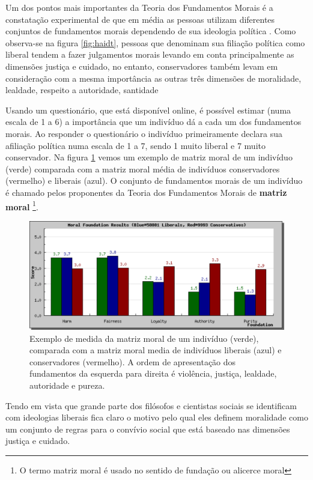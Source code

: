 Um dos pontos mais importantes da Teoria dos Fundamentos Morais é a
constatação experimental de que em média as pessoas utilizam diferentes
conjuntos de fundamentos morais dependendo de sua ideologia política
\citep{Haidt2007,Haidt2009}\cite{Haidt2007,Haidt2009}.  Como observa-se
na figura \ref{fig:haidt}, pessoas que denominam sua filiação política
como {\blue liberal} tendem a fazer julgamentos morais levando em conta
principalmente as dimensões {\blue justiça e cuidado}, no entanto, {\red
conservadores} também levam em consideração com a mesma importância as
outras três dimensões de moralidade, {\red lealdade, respeito a autoridade,
santidade}

Usando um questionário, que está disponível online, é
possível estimar (numa escala de 1 a 6) a importância que um indivíduo dá
a cada um dos fundamentos morais. Ao responder o questionário o indivíduo
primeiramente declara sua afiliação política numa escala de 1 a 7, sendo
1 muito liberal e 7 muito conservador.  Na figura \ref{fig:moralmatrix}
vemos um exemplo de matriz moral de um indivíduo (verde) comparada com a
matriz moral média de indivíduos conservadores (vermelho) e liberais (azul).
O conjunto de fundamentos morais de um indivíduo é chamado pelos proponentes
da Teoria dos Fundamentos Morais de \textbf{matriz moral} \footnote{O termo
matriz moral é  usado no sentido de fundação ou alicerce moral}.

\begin{figure} 
    \centering
    \includegraphics[scale=0.4]{Figures/moralmatrix}
    \caption{
        Exemplo de medida da matriz moral de um indivíduo (verde), comparada
        com a matriz moral media de indivíduos liberais (azul) e conservadores
        (vermelho). A ordem de apresentação dos fundamentos da esquerda
        para direita é violência, justiça, lealdade, autoridade e pureza.
    }
    \label{fig:moralmatrix}
\end{figure}

Tendo em vista que grande parte dos filósofos e cientistas sociais se
identificam com ideologias liberais fica claro o motivo pelo qual eles
definem moralidade como um conjunto de regras para o convívio social que
está baseado nas dimensões justiça e cuidado.

